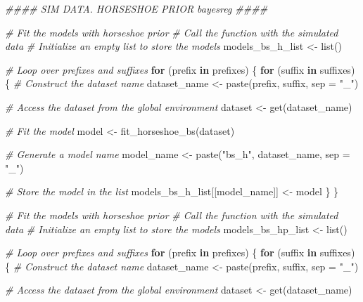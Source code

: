 \documentclass[
  11pt,
]{article}
\newenvironment{Shaded}{}{}
\newcommand{\AttributeTok}[1]{\textcolor[rgb]{0.49,0.56,0.16}{#1}}
\newcommand{\CommentTok}[1]{\textcolor[rgb]{0.38,0.63,0.69}{\textit{#1}}}
\newcommand{\ControlFlowTok}[1]{\textcolor[rgb]{0.00,0.44,0.13}{\textbf{#1}}}
\newcommand{\DocumentationTok}[1]{\textcolor[rgb]{0.73,0.13,0.13}{\textit{#1}}}
\newcommand{\FunctionTok}[1]{\textcolor[rgb]{0.02,0.16,0.49}{#1}}
\newcommand{\NormalTok}[1]{#1}
\newcommand{\OtherTok}[1]{\textcolor[rgb]{0.00,0.44,0.13}{#1}}
\newcommand{\StringTok}[1]{\textcolor[rgb]{0.25,0.44,0.63}{#1}}
\begin{document}
\begin{Shaded}
\begin{Highlighting}[]
\DocumentationTok{\#\#\#\# SIM DATA. HORSESHOE PRIOR \textquotesingle{}bayesreg\textquotesingle{} \#\#\#\#}

\CommentTok{\# Fit the models with horseshoe prior}
\CommentTok{\# Call the function with the simulated data}
\CommentTok{\# Initialize an empty list to store the models}
\NormalTok{models\_bs\_h\_list }\OtherTok{\textless{}{-}} \FunctionTok{list}\NormalTok{()}

\CommentTok{\#   Loop over prefixes and suffixes}
\ControlFlowTok{for}\NormalTok{ (prefix }\ControlFlowTok{in}\NormalTok{ prefixes) \{}
  \ControlFlowTok{for}\NormalTok{ (suffix }\ControlFlowTok{in}\NormalTok{ suffixes) \{}
    \CommentTok{\# Construct the dataset name}
\NormalTok{    dataset\_name }\OtherTok{\textless{}{-}} \FunctionTok{paste}\NormalTok{(prefix, suffix, }\AttributeTok{sep =} \StringTok{"\_"}\NormalTok{)}
    
    \CommentTok{\# Access the dataset from the global environment}
\NormalTok{    dataset }\OtherTok{\textless{}{-}} \FunctionTok{get}\NormalTok{(dataset\_name)}
    
    \CommentTok{\# Fit the model}
\NormalTok{    model }\OtherTok{\textless{}{-}} \FunctionTok{fit\_horseshoe\_bs}\NormalTok{(dataset)}
    
    \CommentTok{\# Generate a model name}
\NormalTok{    model\_name }\OtherTok{\textless{}{-}} \FunctionTok{paste}\NormalTok{(}\StringTok{"bs\_h"}\NormalTok{, dataset\_name, }\AttributeTok{sep =} \StringTok{"\_"}\NormalTok{)}
    
    \CommentTok{\# Store the model in the list}
\NormalTok{    models\_bs\_h\_list[[model\_name]] }\OtherTok{\textless{}{-}}\NormalTok{ model}
\NormalTok{  \}}
\NormalTok{\}}

\CommentTok{\# Fit the models with horseshoe prior}
\CommentTok{\# Call the function with the simulated data}
\CommentTok{\# Initialize an empty list to store the models}
\NormalTok{models\_bs\_hp\_list }\OtherTok{\textless{}{-}} \FunctionTok{list}\NormalTok{()}

\CommentTok{\#   Loop over prefixes and suffixes}
\ControlFlowTok{for}\NormalTok{ (prefix }\ControlFlowTok{in}\NormalTok{ prefixes) \{}
  \ControlFlowTok{for}\NormalTok{ (suffix }\ControlFlowTok{in}\NormalTok{ suffixes) \{}
    \CommentTok{\# Construct the dataset name}
\NormalTok{    dataset\_name }\OtherTok{\textless{}{-}} \FunctionTok{paste}\NormalTok{(prefix, suffix, }\AttributeTok{sep =} \StringTok{"\_"}\NormalTok{)}
    
    \CommentTok{\# Access the dataset from the global environment}
\NormalTok{    dataset }\OtherTok{\textless{}{-}} \FunctionTok{get}\NormalTok{(dataset\_name)}
    

\end{Highlighting}
\end{Shaded}
\end{document}
